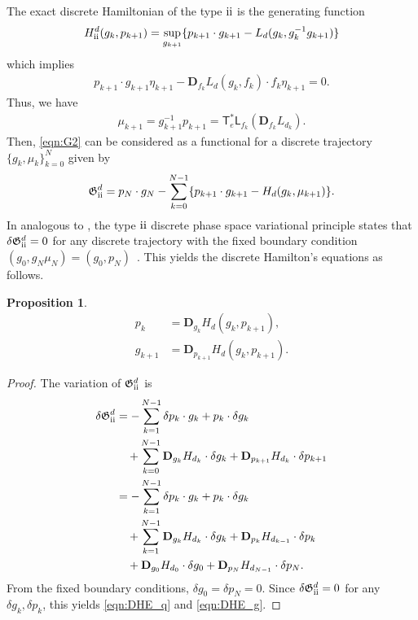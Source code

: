 \documentclass[letterpaper, 10pt, conference]{ieeeconf}
\newcommand{\T}{\ensuremath{\mathsf{T}}}
\renewcommand{\L}{\ensuremath{\mathsf{L}}}
\newcommand{\D}{\ensuremath{\mathbf{D}}}
\newcommand{\RomanNumeralCaps}[1]{\textup{\uppercase\expandafter{\romannumeral#1}}}
\newcommand{\RII}{\RomanNumeralCaps{2}}
\newtheorem{prop}{Proposition}
\begin{document}
The exact discrete Hamiltonian of the type $\RII$ is the generating function 
\begin{align}
    H^d_\RII (g_k, p_{k+1}) = \sup_{g_{k+1}} \{ p_{k+1}\cdot g_{k+1} - L_d(g_k,g_k^{-1} g_{k+1})\}
\end{align}
which implies
\begin{align*}
    p_{k+1} \cdot g_{k+1}\eta_{k+1} -  \D_{f_k} L_d(g_k, f_k )\cdot f_k \eta_{k+1} =0.
\end{align*}
Thus, we have
\begin{align}
    \mu_{k+1} = g_{k+1}^{-1} p_{k+1} = \T^*_e\L_{f_k} (\D_{f_k} L_{d_k}).\label{eqn:DLT+}
\end{align}
Then, \eqref{eqn:G2} can be considered as a functional for a discrete trajectory $\{g_k,\mu_k\}_{k=0}^N$ given by
\begin{align}
    \mathfrak{G}_\RII^d = p_N\cdot g_N - \sum_{k=0}^{N-1} \{p_{k+1}\cdot g_{k+1} - H_d(g_k,\mu_{k+1})\}.
\end{align}
In analogous to , the type $\RII$ discrete phase space variational principle states that $\delta\mathfrak{G}_\RII^d=0$ for any discrete trajectory with the fixed boundary condition $(g_0,g_N\mu_N)= (g_0,p_N)$~\cite{leok2011discrete}.
This yields the discrete Hamilton's equations as follows. 

\begin{prop}
    \begin{align}
        p_k & = \D_{g_k} H_d( g_k, p_{k+1}),\label{eqn:DHE_q}\\
        g_{k+1} & = \D_{p_{k+1}} H_d(g_{k}, p_{k+1}).\label{eqn:DHE_g}
    \end{align}
\end{prop}
\begin{proof}
    The variation of $\mathfrak{G}_\RII^d$ is
\begin{align*}
    \delta \mathfrak{G}_\RII^d 
    & =  - \sum_{k=1}^{N-1} \delta p_k \cdot g_k + p_k \cdot \delta g_k\\
    & \quad +\sum_{k=0}^{N-1} \D_{g_k} H_{d_k} \cdot \delta g_k + \D_{p_{k+1}} H_{d_k} \cdot \delta p_{k+1}\\
    & =  - \sum_{k=1}^{N-1} \delta p_k \cdot g_k + p_k \cdot \delta g_k\\
    & \quad +\sum_{k=1}^{N-1} \D_{g_k} H_{d_k} \cdot \delta g_k + \D_{p_{k}} H_{d_{k-1}} \cdot \delta p_{k}\\
    & \quad +\D_{g_0} H_{d_0} \cdot \delta g_0 + \D_{p_{N}} H_{d_{N-1}} \cdot \delta p_{N}.
\end{align*}
From the fixed boundary conditions, $\delta g_0 = \delta p_N=0$. 
Since $\delta \mathfrak{G}_\RII^d =0$ for any $\delta g_k, \delta p_k$, this yields \eqref{eqn:DHE_q} and \eqref{eqn:DHE_g}.
\end{proof}
\end{document}
